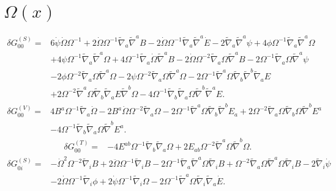 \documentclass[10pt,letterpaper]{article}
\begin{document}
\section*{ $\Omega(x)$}
\begin{align}
\delta G_{00}^{(S)}={}&6 \dot{\psi} \dot{\Omega} \Omega^{-1}
 + 2 \dot{\Omega} \Omega^{-1} \tilde{\nabla}_{a}\tilde{\nabla}^{a}B
 - 2 \dot{\Omega} \Omega^{-1} \tilde{\nabla}_{a}\tilde{\nabla}^{a}\dot{E}
 - 2 \tilde{\nabla}_{a}\tilde{\nabla}^{a}\psi
 + 4 \phi \Omega^{-1} \tilde{\nabla}_{a}\tilde{\nabla}^{a}\Omega\nonumber\\
& + 4 \psi \Omega^{-1} \tilde{\nabla}_{a}\tilde{\nabla}^{a}\Omega
 + 4 \Omega^{-1} \tilde{\nabla}_{a}\dot{\Omega} \tilde{\nabla}^{a}B
 - 2 \dot{\Omega} \Omega^{-2} \tilde{\nabla}_{a}\Omega \tilde{\nabla}^{a}B
 - 2 \Omega^{-1} \tilde{\nabla}_{a}\Omega \tilde{\nabla}^{a}\psi\nonumber\\
& - 2 \phi \Omega^{-2} \tilde{\nabla}_{a}\Omega \tilde{\nabla}^{a}\Omega
 - 2 \psi \Omega^{-2} \tilde{\nabla}_{a}\Omega \tilde{\nabla}^{a}\Omega
 - 2 \Omega^{-1} \tilde{\nabla}^{a}\Omega \tilde{\nabla}_{b}\tilde{\nabla}^{b}\tilde{\nabla}_{a}E\nonumber\\
& + 2 \Omega^{-2} \tilde{\nabla}^{a}\Omega \tilde{\nabla}_{b}\tilde{\nabla}_{a}E \tilde{\nabla}^{b}\Omega
 - 4 \Omega^{-1} \tilde{\nabla}_{b}\tilde{\nabla}_{a}\Omega \tilde{\nabla}^{b}\tilde{\nabla}^{a}E.
\end{align}
\begin{align}
\delta G_{00}^{(V)}={}&4 B^{a} \Omega^{-1} \tilde{\nabla}_{a}\dot{\Omega}
 - 2 B^{a} \dot{\Omega} \Omega^{-2} \tilde{\nabla}_{a}\Omega
 - 2 \Omega^{-1} \tilde{\nabla}^{a}\Omega \tilde{\nabla}_{b}\tilde{\nabla}^{b}E_{a}
 + 2 \Omega^{-2} \tilde{\nabla}_{a}\Omega \tilde{\nabla}_{b}\Omega \tilde{\nabla}^{b}E^{a}\nonumber\\
& - 4 \Omega^{-1} \tilde{\nabla}_{b}\tilde{\nabla}_{a}\Omega \tilde{\nabla}^{b}E^{a}.
\end{align}
\begin{align}
\delta G_{00}^{(T)}={}&-4 E^{ab} \Omega^{-1} \tilde{\nabla}_{b}\tilde{\nabla}_{a}\Omega
 + 2 E_{ab} \Omega^{-2} \tilde{\nabla}^{a}\Omega \tilde{\nabla}^{b}\Omega.
\end{align}
\begin{align}
\delta G_{0i}^{(S)}={}&- \dot{\Omega}^2 \Omega^{-2} \tilde{\nabla}_{i}B
 + 2 \ddot{\Omega} \Omega^{-1} \tilde{\nabla}_{i}B
 - 2 \Omega^{-1} \tilde{\nabla}_{a}\tilde{\nabla}^{a}\Omega \tilde{\nabla}_{i}B
 + \Omega^{-2} \tilde{\nabla}_{a}\Omega \tilde{\nabla}^{a}\Omega \tilde{\nabla}_{i}B
 - 2 \tilde{\nabla}_{i}\dot{\psi}\nonumber\\
& - 2 \dot{\Omega} \Omega^{-1} \tilde{\nabla}_{i}\phi
 + 2 \dot{\psi} \Omega^{-1} \tilde{\nabla}_{i}\Omega
 - 2 \Omega^{-1} \tilde{\nabla}^{a}\Omega \tilde{\nabla}_{i}\tilde{\nabla}_{a}\dot{E}.
\end{align}
\end{document}
